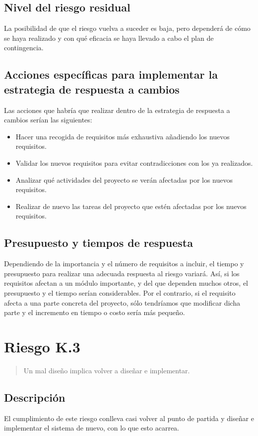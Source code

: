 \documentclass[11pt,a4paper,spanish,twoside]{book}
\begin{document}
\subsection{Nivel del riesgo residual}
La posibilidad de que el riesgo vuelva a suceder es baja, pero dependerá de 
cómo se haya realizado y con qué eficacia se haya llevado a cabo el plan de 
contingencia.

\subsection{Acciones específicas para implementar la estrategia de respuesta
  a cambios}
Las acciones que habría que realizar dentro de la estrategia de respuesta a
cambios serían las siguientes:
\begin{itemize}
\item Hacer una recogida de requisitos más exhaustiva añadiendo los nuevos 
  requisitos.
\item Validar los nuevos requisitos para evitar contradicciones con los ya 
  realizados.
\item Analizar qué actividades del proyecto se verán afectadas por los nuevos 
  requisitos.
\item Realizar de nuevo las tareas del proyecto que estén afectadas por los 
  nuevos requisitos.
\end{itemize}

\subsection{Presupuesto y tiempos de respuesta}
Dependiendo de la importancia y el número de requisitos a incluir, el tiempo y 
presupuesto para realizar una adecuada respuesta al riesgo variará. Así, si los 
requisitos afectan a un módulo importante, y del que dependen muchos otros, el 
presupuesto y el tiempo serían considerables. Por el contrario, si el
requisito afecta a una parte concreta del proyecto, sólo tendríamos que 
modificar dicha parte y el incremento en tiempo o costo sería más pequeño.

\section{Riesgo K.3}
\begin{quote}
  Un mal diseño implica volver a diseñar e implementar.
\end{quote}

\subsection{Descripción}
El cumplimiento de este riesgo conlleva casi volver al punto de partida y
diseñar e implementar el sistema de nuevo, con lo que esto acarrea.
\end{document}
